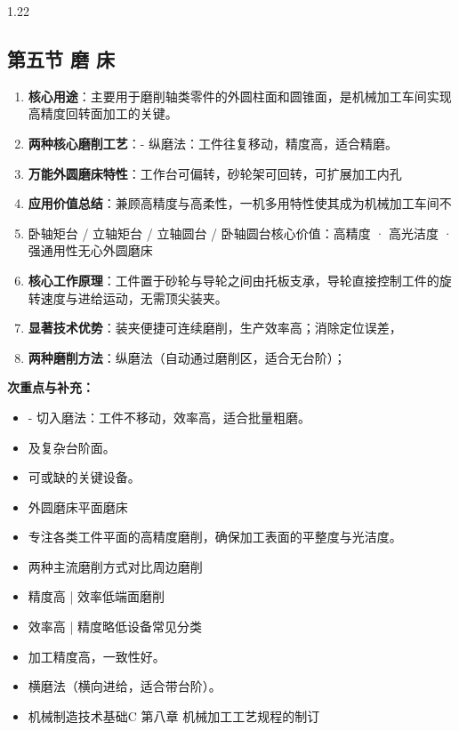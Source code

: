 \documentclass[12pt,a4paper]{article}
\begin{document}
\begin{spacing}{1.22}
\subsection{第五节 磨 床}
\begin{tcolorbox}[colback=yellow!6,colframe=red!55!black,title=重点,left=1mm,right=1mm]
\begin{enumerate}[leftmargin=2.2em,label=\arabic*.]
  \item \textbf{核心用途}：主要用于磨削轴类零件的外圆柱面和圆锥面，是机械加工车间实现高精度回转面加工的关键。
  \item \textbf{两种核心磨削工艺}：- 纵磨法：工件往复移动，精度高，适合精磨。
  \item \textbf{万能外圆磨床特性}：工作台可偏转，砂轮架可回转，可扩展加工内孔
  \item \textbf{应用价值总结}：兼顾高精度与高柔性，一机多用特性使其成为机械加工车间不
  \item 卧轴矩台 / 立轴矩台 / 立轴圆台 / 卧轴圆台核心价值：高精度 · 高光洁度 · 强通用性无心外圆磨床
  \item \textbf{核心工作原理}：工件置于砂轮与导轮之间由托板支承，导轮直接控制工件的旋转速度与进给运动，无需顶尖装夹。
  \item \textbf{显著技术优势}：装夹便捷可连续磨削，生产效率高；消除定位误差，
  \item \textbf{两种磨削方法}：纵磨法（自动通过磨削区，适合无台阶）；
\end{enumerate}
\end{tcolorbox}
\noindent\textbf{次重点与补充：}
\begin{itemize}[leftmargin=2.2em,label=--]
  \item - 切入磨法：工件不移动，效率高，适合批量粗磨。
  \item 及复杂台阶面。
  \item 可或缺的关键设备。
  \item 外圆磨床平面磨床
  \item 专注各类工件平面的高精度磨削，确保加工表面的平整度与光洁度。
  \item 两种主流磨削方式对比周边磨削
  \item 精度高 | 效率低端面磨削
  \item 效率高 | 精度略低设备常见分类
  \item 加工精度高，一致性好。
  \item 横磨法（横向进给，适合带台阶）。
  \item 机械制造技术基础C 第八章 机械加工工艺规程的制订
\end{itemize}


\end{spacing}
\end{document}
